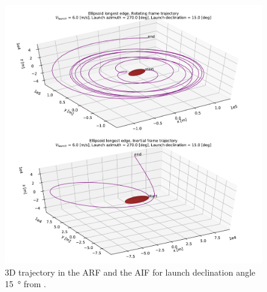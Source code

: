 \begin{figure}[htb]
\centering
\captionsetup{justification=centering}
\includegraphics[width=\textwidth, height=0.5\textheight, keepaspectratio=true]{non_conservative_escape_speed/multiRev_3D_trajectory_declination15.pdf}
\caption{3D trajectory in the \gls{ARF} and the \gls{AIF} for launch declination angle \SI{15}{\degree} from .}
\label{fig:3d_traj_declination_15}
\end{figure}
\FloatBarrier
